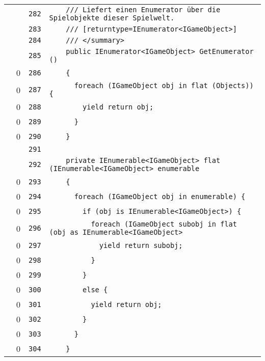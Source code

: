\documentclass[a4paper,10pt]{article}
\begin{document}
\begin{longtable}[l]{lrrl}
\cellcolor{gray} &  & \verb~282~ & \verb~    /// Liefert einen Enumerator über die Spielobjekte dieser Spielwelt.~\\
\cellcolor{gray} &  & \verb~283~ & \verb~    /// [returntype=IEnumerator<IGameObject>]~\\
\cellcolor{gray} &  & \verb~284~ & \verb~    /// </summary>~\\
\cellcolor{gray} &  & \verb~285~ & \verb~    public IEnumerator<IGameObject> GetEnumerator ()~\\
\cellcolor{red} & 0 & \verb~286~ & \verb~    {~\\
\cellcolor{red} & 0 & \verb~287~ & \verb~      foreach (IGameObject obj in flat (Objects)) {~\\
\cellcolor{red} & 0 & \verb~288~ & \verb~        yield return obj;~\\
\cellcolor{red} & 0 & \verb~289~ & \verb~      }~\\
\cellcolor{red} & 0 & \verb~290~ & \verb~    }~\\
\cellcolor{gray} &  & \verb~291~ & \verb~~\\
\cellcolor{gray} &  & \verb~292~ & \verb~    private IEnumerable<IGameObject> flat (IEnumerable<IGameObject> enumerable~\\
\cellcolor{red} & 0 & \verb~293~ & \verb~    {~\\
\cellcolor{red} & 0 & \verb~294~ & \verb~      foreach (IGameObject obj in enumerable) {~\\
\cellcolor{red} & 0 & \verb~295~ & \verb~        if (obj is IEnumerable<IGameObject>) {~\\
\cellcolor{red} & 0 & \verb~296~ & \verb~          foreach (IGameObject subobj in flat (obj as IEnumerable<IGameObject>~\\
\cellcolor{red} & 0 & \verb~297~ & \verb~            yield return subobj;~\\
\cellcolor{red} & 0 & \verb~298~ & \verb~          }~\\
\cellcolor{red} & 0 & \verb~299~ & \verb~        }~\\
\cellcolor{red} & 0 & \verb~300~ & \verb~        else {~\\
\cellcolor{red} & 0 & \verb~301~ & \verb~          yield return obj;~\\
\cellcolor{red} & 0 & \verb~302~ & \verb~        }~\\
\cellcolor{red} & 0 & \verb~303~ & \verb~      }~\\
\cellcolor{red} & 0 & \verb~304~ & \verb~    }~\\

\end{longtable}
\end{document}

